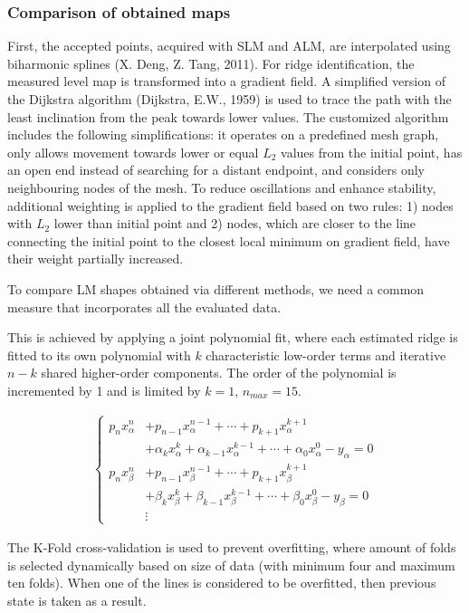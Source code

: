 \documentclass[journal,twoside,web]{ieeecolor2}
\begin{document}
\subsubsection{Comparison of obtained maps}
First, the accepted points, acquired with SLM and ALM, are interpolated using biharmonic splines (X. Deng, Z. Tang, 2011). For ridge identification, the measured level map is transformed into a gradient field. A simplified version of the Dijkstra algorithm (Dijkstra, E.W., 1959) is used to trace the path with the least inclination from the peak towards lower values. The customized algorithm includes the following simplifications: it operates on a predefined mesh graph, only allows movement towards lower or equal $L_2$ values from the initial point,  has an open end instead of searching for a distant endpoint, and considers only neighbouring nodes of the mesh. To reduce oscillations and enhance stability, additional weighting is applied to the gradient field based on two rules: 1) nodes with $L_2$ lower than initial point and 2) nodes, which are closer to the line connecting the initial point to the closest local minimum on gradient field, have their weight partially increased. 

To compare LM shapes obtained via different methods, we need a common measure that incorporates all the evaluated data. 

This is achieved by applying a joint polynomial fit, where each estimated ridge is fitted to its own polynomial with $k$ characteristic low-order terms and iterative $n-k$ shared higher-order components. The order of the polynomial is incremented by 1 and is limited by $k = 1$, $n_{max} = 15$.


\begin{align}
\begin{cases}
p_{n} x_{\alpha}^n&+p_{n-1} x_{\alpha}^{n-1}+\cdots+p_{k+1} x_{\alpha}^{k+1} \\
&+\alpha_k x_{\alpha}^{k}+\alpha_{k-1} x_{\alpha}^{k-1}+\cdots+\alpha _0 x_{\alpha}^0-y_{\alpha} =0 \\
p_{n} x_{\beta}^n&+p_{n-1} x_{\beta}^{n-1}+\cdots+p_{k+1} x_{\beta}^{k+1} \\
&+\beta_k x_{\beta}^{k}+\beta_{k-1} x_{\beta}^{k-1}+\cdots+\beta _0 x_{\beta}^0-y_{\beta} =0 \\
& \vdots 
\end{cases}
\label{eq1}
\end{align}

The K-Fold cross-validation is used to prevent overfitting, where amount of folds is selected dynamically based on size of data (with minimum four and maximum ten folds). When one of the lines is considered to be overfitted, then previous state is taken as a result.
\end{document}
